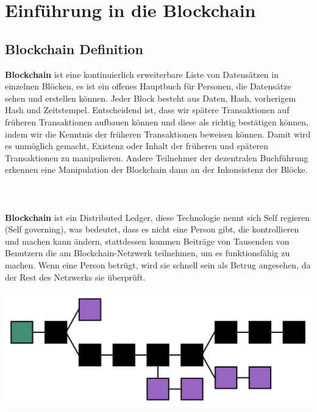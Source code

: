 \documentclass[ngerman]{scrreprt}
\begin{document}
\chapter{Einführung in die Blockchain}

\section{Blockchain Definition}
\textbf{Blockchain} ist eine kontinuierlich erweiterbare Liste von Datensätzen in einzelnen Blöcken, es ist ein offenes Hauptbuch für Personen, die Datensätze sehen und erstellen können. Jeder Block besteht aus Daten, Hash, vorherigem Hash und Zeitstempel. Entscheidend ist, dass wir spätere Transaktionen auf früheren Transaktionen aufbauen können und diese als richtig bestätigen können, indem wir die Kenntnis der früheren Transaktionen beweisen können. Damit wird es unmöglich gemacht, Existenz oder Inhalt der früheren und späteren Transaktionen zu manipulieren. Andere Teilnehmer der dezentralen Buchführung erkennen eine Manipulation der Blockchain dann an der Inkonsistenz der Blöcke.\\
\\
\\
\\
\textbf{Blockchain} ist ein Distributed Ledger, diese Technologie nennt sich Self regieren (Self governing), was bedeutet, dass es nicht eine Person gibt, die kontrollieren und machen kann
ändern, stattdessen kommen Beiträge von Tausenden von Benutzern
die am Blockchain-Netzwerk teilnehmen, um es funktionsfähig zu machen. Wenn eine Person betrügt, wird sie schnell sein
als Betrug angesehen, da der Rest des Netzwerks sie überprüft.


\includegraphics[width=\linewidth]{1.png}
\end{document}
